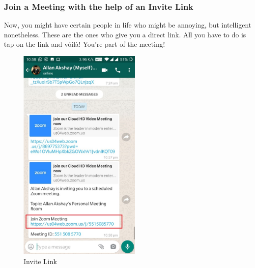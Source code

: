 \documentclass[14pt]{report}
\begin{document}
                        \subsubsection{Join a Meeting with the help of an Invite Link}
                            Now, you might have certain people in life who might be annoying, but intelligent nonetheless. These are the ones who give you a direct link. All you have to do is tap on the link and v\'oil\`a! You're part of the meeting!\\
                             \begin{figure}[h]
                                \includegraphics[width=6cm]{Invite.jpeg}
                                \centering
                                \caption{Invite Link}
                                \label{fig:InvitePage}
                            \end{figure}
\end{document}
